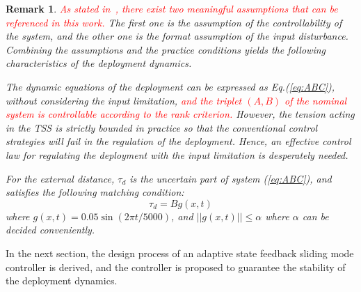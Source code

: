 \documentclass[3p]{elsarticle}
\theoremstyle{plain}
\newtheorem{myrem}{Remark}
\begin{document}
\begin{myrem}
\textcolor{red}{As stated in~\cite{Hu2008Robust}, there exist two meaningful assumptions that can be referenced in this work.} The first one is the assumption of the controllability of the system, and the other one is the format assumption of the input disturbance. Combining the assumptions and the practice conditions yields the following characteristics of the deployment dynamics.\par
The dynamic equations of the deployment can be expressed as Eq.(\ref{eq:ABC}), without considering the input limitation, \textcolor{red}{and the triplet $(A,B)$ of the nominal system is controllable according to the rank criterion.} However, the tension acting in the TSS is strictly bounded in practice so that the conventional control strategies will fail in the regulation of the deployment. Hence, an effective control law for regulating the deployment with the input limitation is desperately needed.\par
For the external distance, $\tau_d$ is the uncertain part of system (\ref{eq:ABC}), and satisfies the following matching condition:
\begin{equation}
\tau_d=Bg(x,t)
\end{equation}
where $g(x,t) = 0.05\sin(2\pi t /5000)$, and $||g(x,t)||\le \alpha$ where $\alpha$ can be decided conveniently.
\label{as:1}
\end{myrem}
In the next section, the design process of an adaptive state feedback sliding mode controller is derived, and the controller is proposed to guarantee the stability of the deployment dynamics.
\end{document}

